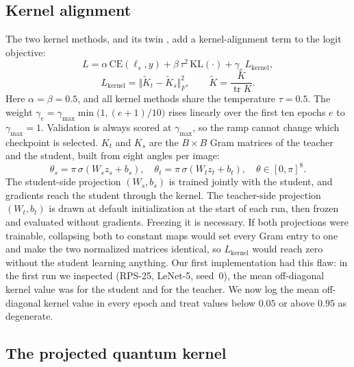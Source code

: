\subsection{Kernel alignment}
\label{sec:kernel-alignment}

The two kernel methods, \Pqk and its twin \Rbf, add a kernel-alignment term to the logit objective:
\begin{equation}
  L = \alpha\,\mathrm{CE}(\ell_s,y) + \beta\,\tau^{2}\,\mathrm{KL}(\cdot) + \gamma_e\,L_{\mathrm{kernel}},
  \label{eq:loss}
\end{equation}
\begin{equation}
  L_{\mathrm{kernel}} = \big\Vert \tilde K_t - \tilde K_s \big\Vert_F^{2},\qquad
  \tilde K = \frac{K}{\operatorname{tr}K}.
\end{equation}
Here $\alpha=\beta=0.5$, and all kernel methods share the temperature $\tau=0.5$.
The weight $\gamma_e=\gamma_{\max}\min\!\big(1,(e{+}1)/10\big)$ rises linearly over the first ten epochs $e$ to $\gamma_{\max}=1$.
Validation is always scored at $\gamma_{\max}$, so the ramp cannot change which checkpoint is selected.
$K_t$ and $K_s$ are the $B\times B$ Gram matrices of the teacher and the student, built from eight angles per image:
\begin{equation}
  \theta_s = \pi\,\sigma(W_s z_s + b_s),\quad
  \theta_t = \pi\,\sigma(W_t z_t + b_t),\quad \theta\in[0,\pi]^{8}.
\end{equation}
The student-side projection $(W_s,b_s)$ is trained jointly with the student, and gradients reach the student through the kernel.
The teacher-side projection $(W_t,b_t)$ is drawn at default initialization at the start of each run, then frozen and evaluated without gradients.
Freezing it is necessary. If both projections were trainable, collapsing both to constant maps would set every Gram entry to one and make the two normalized matrices identical, so $L_{\mathrm{kernel}}$ would reach zero without the student learning anything.
Our first implementation had this flaw: in the first \Pqk run we inspected (RPS-25, LeNet-5, seed~0), the mean off-diagonal kernel value was \CollapseStudent{} for the student and \CollapseTeacher{} for the teacher.
We now log the mean off-diagonal kernel value in every epoch and treat values below $0.05$ or above $0.95$ as degenerate.

\subsection{The projected quantum kernel}
\label{sec:pqk}

